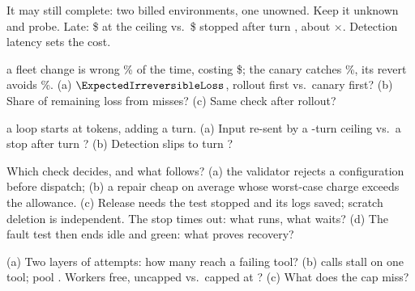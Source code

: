 \documentclass{studysheet}
\begin{document}
\begin{rightcol}
%
  {It may still complete: two billed environments, one unowned. Keep it unknown and probe.}{}
%
  {Late: \$ at the ceiling vs.\ \$ stopped after turn ,
   about $\times$. Detection latency sets the cost.}{}

\vspace{2pt}
\begin{qs}
\item \assumed{} a fleet change is wrong \% of the time, costing \$; the canary catches
  \%, its revert avoids \%. (a) $\ExpectedIrreversibleLoss$, rollout first vs.\ canary
  first? (b) Share of remaining loss from misses? (c) Same check after rollout?
\item \assumed{} a loop starts at  tokens, adding  a turn. (a) Input re-sent by a
  -turn ceiling vs.\ a stop after turn ? (b) Detection slips to turn ?
\item Which check decides, and what follows? (a) the validator rejects a configuration before dispatch; (b) a
  repair cheap on average whose worst-case charge exceeds the allowance. (c) Release needs the test
  stopped and its logs saved; scratch deletion is independent. The stop times out: what runs, what waits? (d) The fault test then ends idle and green: what proves recovery?
\item \assumed{} (a) Two layers of  attempts: how many reach a failing tool? (b) 
  calls stall on one tool; pool . Workers free, uncapped vs.\ capped at ? (c) What does the cap miss?
\end{qs}
\end{rightcol}
\end{document}
